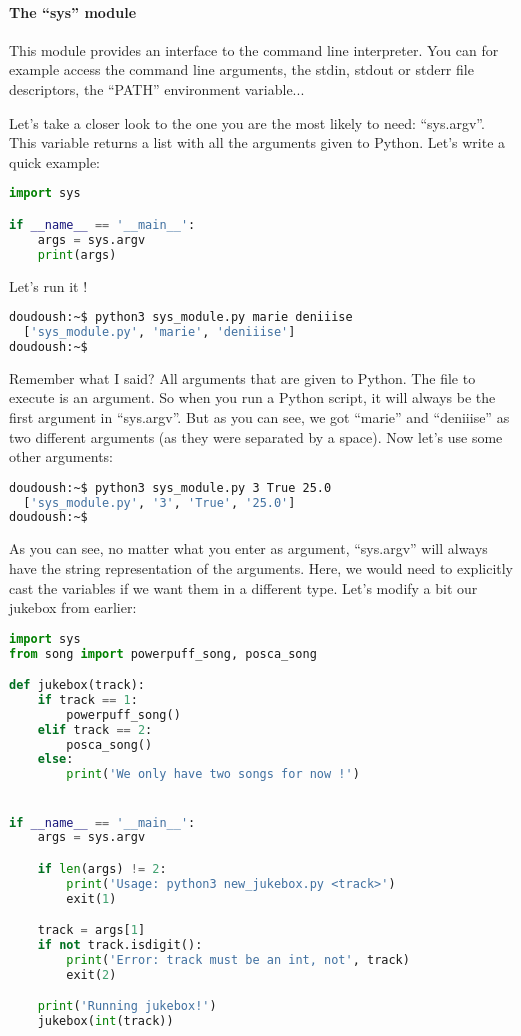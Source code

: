 \paragraph{The ``sys'' module}

This module provides an interface to the command line interpreter. You can
for example access the command line arguments, the stdin, stdout or stderr
file descriptors, the ``PATH'' environment variable...

\vspace{5mm}

Let's take a closer look to the one you are the most likely to need: ``sys.argv''.
This variable returns a list with all the arguments given to Python.
Let's write a quick example:

\begin{lstlisting}[language=python]
import sys

if __name__ == '__main__':
    args = sys.argv
    print(args)
\end{lstlisting}

Let's run it !

\begin{lstlisting}[language=bash]
doudoush:~$ python3 sys_module.py marie deniiise
  ['sys_module.py', 'marie', 'deniiise']
doudoush:~$
\end{lstlisting}

Remember what I said? All arguments that are given to Python. The file to execute
is an argument. So when you run a Python script, it will always be the first argument
in ``sys.argv''. But as you can see, we got ``marie'' and ``deniiise'' as two different
arguments (as they were separated by a space). Now let's use some other arguments:

\begin{lstlisting}[language=bash]
doudoush:~$ python3 sys_module.py 3 True 25.0
  ['sys_module.py', '3', 'True', '25.0']
doudoush:~$
\end{lstlisting}

As you can see, no matter what you enter as argument, ``sys.argv'' will always
have the string representation of the arguments. Here, we would need to explicitly
cast the variables if we want them in a different type. Let's modify a bit our
jukebox from earlier:

\begin{lstlisting}[language=python]
import sys
from song import powerpuff_song, posca_song

def jukebox(track):
    if track == 1:
        powerpuff_song()
    elif track == 2:
        posca_song()
    else:
        print('We only have two songs for now !')


if __name__ == '__main__':
    args = sys.argv

    if len(args) != 2:
        print('Usage: python3 new_jukebox.py <track>')
        exit(1)

    track = args[1]
    if not track.isdigit():
        print('Error: track must be an int, not', track)
        exit(2)

    print('Running jukebox!')
    jukebox(int(track))
\end{lstlisting}

